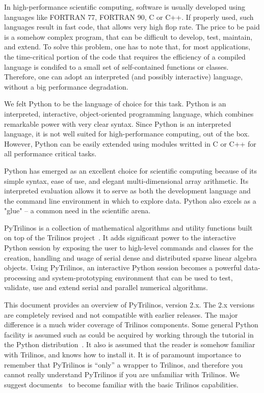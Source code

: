 \documentclass[10pt,relax]{SANDreport}
\begin{document}
In high-performance scientific computing, software is usually developed using
languages like FORTRAN 77, FORTRAN 90, C or C++. If properly used, such
languages result in fast code, that allows very high flop rate. The price to
be paid is a somehow complex program, that can be difficult to develop, test,
maintain, and extend. To solve this problem, one has to note that, for most
applications, the time-critical portion of the code that requires the
efficiency of a compiled language is condifed to a small set of
self-contained functions or classes. Therefore, one can adopt an interpreted
(and possibly interactive) language, without a big performance degradation.

We felt Python to be the language of choice for this task. Python is an
interpreted, interactive, object-oriented programming language, which combines
remarkable power with very clear syntax. Since Python is an interpreted
language, it is not well suited for high-performance computing, out of the
box. However, Python can be easily extended using modules writted in C or C++
for all performance critical tasks.
\smallskip

Python has emerged as an excellent choice for scientific computing because of
its simple syntax, ease of use, and elegant multi-dimensional array
arithmetic. Its interpreted evaluation allows it to serve as both the
development language and the command line environment in which to explore
data. Python also excels as a "glue" -- a common need in the scientific arena.

PyTrilinos is a collection of mathematical algorithms and utility functions
built on top of the Trilinos project~\cite{Trilinos-home-page}.  It adds
significant power to the interactive Python session by exposing the user to
high-level commands and classes for the creation, handling and usage of serial
dense and distributed sparse linear algebra objects. Using PyTrilinos, an
interactive Python session becomes a powerful data-processing and
system-prototyping environment that can be used to test, validate, use and
extend serial and parallel numerical algorithms.

\smallskip

This document provides an overview of PyTrilinos, version 2.x.  The 2.x
versions are completely revised and not compatible with earlier releases. The
major difference is a much wider coverage of Trilinos components. Some general
Python facility is assumed such as could be acquired by working through the
tutorial in the Python distribution~\cite{python-tutorial}.  It also is
assumed that the reader is somehow familiar with Trilinos, and knows how to
install it.  It is of paramount importance to remember that PyTrilinos is
``only'' a wrapper to Trilinos, and therefore you cannot really understand
PyTrilinos if you are unfamiliar with Trilinos.  We suggest
documents~\cite{Trilinos-tutorial} to become familiar with the basic Trilinos
capabilities.
\end{document}
